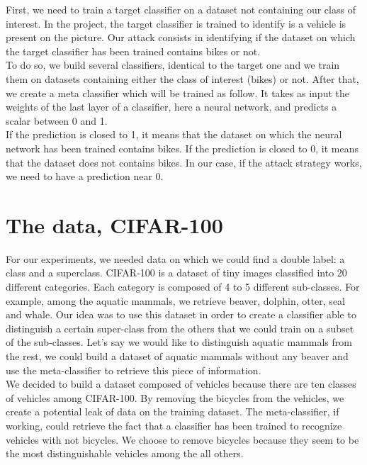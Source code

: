 \documentclass{article}
\begin{document}
First, we need to train a target classifier on a dataset not containing our class of interest. In the project, the target classifier is trained to identify is a vehicle is present on the picture. Our attack consists in identifying if the dataset on which the target classifier has been trained contains bikes or not.\\

To do so, we build several classifiers, identical to the target one and we train them on datasets containing either the class of interest (bikes) or not. After that, we create a meta classifier which will be trained as follow. It takes as input the weights of the last layer of a classifier, here a neural network, and predicts a scalar between 0 and 1.\\

If the prediction is closed to 1, it means that the dataset on which the neural network has been trained contains bikes. If the prediction is closed to 0, it means that the dataset does not contains bikes. In our case, if the attack strategy works, we need to have a prediction near 0.

\section{The data, CIFAR-100}
\label{sec:cifar100}

For our experiments, we needed data on which we could find a double label: a class and a superclass. \textsc{CIFAR-100} is a dataset of tiny images classified into 20 different categories. Each category is composed of 4 to 5 different sub-classes. For example, among the aquatic mammals, we retrieve beaver, dolphin, otter, seal and whale. Our idea was to use this dataset in order to create a classifier able to distinguish a certain super-class from the others that we could train on a subset of the sub-classes. Let's say we would like to distinguish aquatic mammals from the rest, we could build a dataset of aquatic mammals without any beaver and use the meta-classifier to retrieve this piece of information.\\

We decided to build a dataset composed of vehicles because there are ten classes of vehicles among \textsc{CIFAR-100}. By removing the bicycles from the vehicles, we create a potential leak of data on the training dataset. The meta-classifier, if working, could retrieve the fact that a classifier has been trained to recognize vehicles with not bicycles. We choose to remove bicycles because they seem to be the most distinguishable vehicles among the all others. \\
\end{document}
